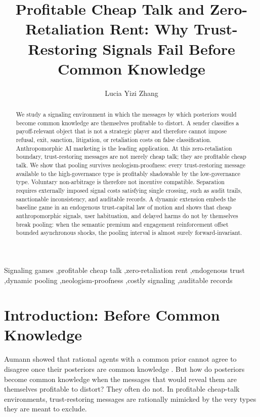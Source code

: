 \documentclass[preprint,authoryear]{elsarticle}
\theoremstyle{definition}
\theoremstyle{plain}
\begin{document}
\begin{frontmatter}

\title{Profitable Cheap Talk and Zero-Retaliation Rent: Why Trust-Restoring Signals Fail Before Common Knowledge}

\author{Lucia Yizi Zhang}
\address{Shanghai Lixin University of Accounting and Finance}

\begin{abstract}
We study a signaling environment in which the messages by which posteriors would become common knowledge are themselves profitable to distort. A sender classifies a payoff-relevant object that is not a strategic player and therefore cannot impose refusal, exit, sanction, litigation, or retaliation costs on false classification. Anthropomorphic AI marketing is the leading application. At this zero-retaliation boundary, trust-restoring messages are not merely cheap talk; they are profitable cheap talk. We show that pooling survives neologism-proofness: every trust-restoring message available to the high-governance type is profitably shadowable by the low-governance type. Voluntary non-arbitrage is therefore not incentive compatible. Separation requires externally imposed signal costs satisfying single crossing, such as audit trails, sanctionable inconsistency, and auditable records. A dynamic extension embeds the baseline game in an endogenous trust-capital law of motion and shows that cheap anthropomorphic signals, user habituation, and delayed harms do not by themselves break pooling: when the semantic premium and engagement reinforcement offset bounded asynchronous shocks, the pooling interval is almost surely forward-invariant.
\end{abstract}

\begin{keyword}
Signaling games \sep profitable cheap talk \sep zero-retaliation rent \sep endogenous trust \sep dynamic pooling \sep neologism-proofness \sep costly signaling \sep auditable records
\end{keyword}

\end{frontmatter}

\section{Introduction: Before Common Knowledge}
\label{sec:introduction}

Aumann showed that rational agents with a common prior cannot agree to disagree once their posteriors are common knowledge \citep{aumann1976agreeing}. But how do posteriors become common knowledge when the messages that would reveal them are themselves profitable to distort? They often do not. In profitable cheap-talk environments, trust-restoring messages are rationally mimicked by the very types they are meant to exclude.
\end{document}
